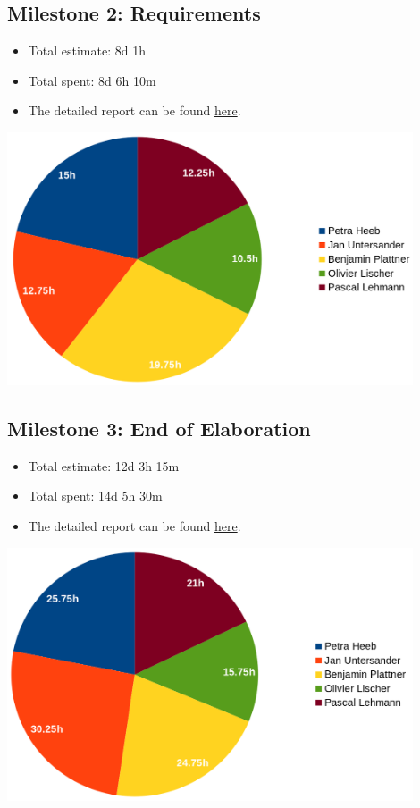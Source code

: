 \subsection{Milestone 2: Requirements}
\begin{itemize}
    \item Total estimate: 8d 1h
    \item Total spent: 8d 6h 10m
    \item The detailed report can be found \href{https://gitlab.ost.ch/SEProj/2022-FS/g03-kubewatch/kubewatch/-/blob/main/Documentation/time-tracking/M2\%20Requirements\%20Time\%20Tracking\%20Report.md}{here}.
\end{itemize}
\includegraphics[width=12cm]{resources/m2_time_tracking_chart.png}

\subsection{Milestone 3: End of Elaboration}
\begin{itemize}
    \item Total estimate: 12d 3h 15m
    \item Total spent: 14d 5h 30m
    \item The detailed report can be found \href{https://gitlab.ost.ch/SEProj/2022-FS/g03-kubewatch/kubewatch/-/blob/main/Documentation/time-tracking/M3\%20End\%20of\%20Elaboration\%20Time\%20Tracking\%20Report.md}{here}.
\end{itemize}
\includegraphics[width=12cm]{resources/m3_time_tracking_chart.png}
